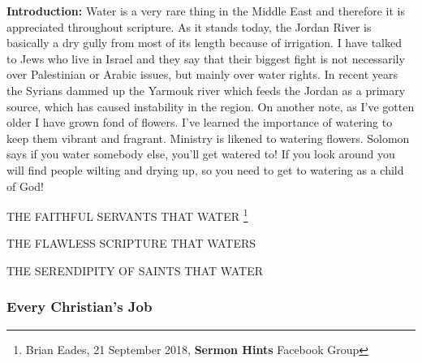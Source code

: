 \textbf{Introduction:} Water is a very rare thing in the Middle East and therefore it is appreciated throughout scripture. As it stands today, the Jordan River is basically a dry gully from most of its length because of irrigation.  I have talked to Jews who live in Israel and they say that their biggest fight is not necessarily over Palestinian or Arabic issues, but mainly over water rights. In recent years the Syrians dammed up the Yarmouk river which feeds the Jordan as a primary source, which has caused instability in the region. On another note, as I've gotten older I have grown fond of flowers. I've learned the importance of watering to keep them vibrant and fragrant. Ministry is likened to watering flowers. Solomon says if you water somebody else, you'll get watered to!  If you look around you will find people wilting and drying up, so you need to get to watering as a child of God!
\begin{compactenum}[I.]
    \item THE FAITHFUL SERVANTS THAT WATER \footnote{Brian Eades, 21 September 2018, \textbf{Sermon Hints} Facebook Group}
    \item THE FLAWLESS SCRIPTURE THAT WATERS
    \item THE SERENDIPITY OF SAINTS THAT WATER
\end{compactenum}

\subsubsection{Every Christian's Job}


